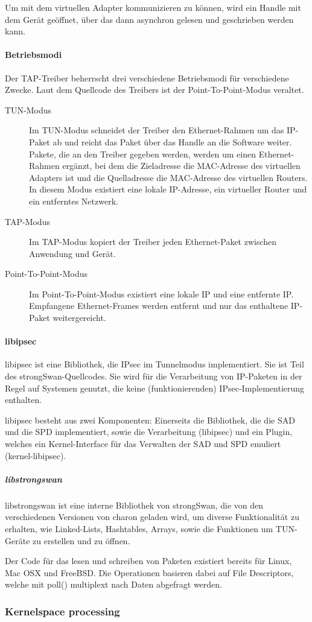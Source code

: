 Um mit dem virtuellen Adapter kommunizieren zu können, wird ein Handle mit dem Gerät
geöffnet, über das dann asynchron gelesen und geschrieben werden kann.

\paragraph{Betriebsmodi}
Der TAP-Treiber beherrscht drei verschiedene Betriebsmodi für verschiedene Zwecke.
Laut dem Quellcode des Treibers ist der Point-To-Point-Modus veraltet.
\begin{description}
\item [TUN-Modus] Im TUN-Modus schneidet der Treiber den Ethernet-Rahmen um das 
IP-Paket ab und reicht das Paket über das Handle an die Software weiter. 
Pakete, die an den Treiber gegeben werden, werden um einen Ethernet-Rahmen
ergänzt, bei dem die Zieladresse die MAC-Adresse des virtuellen Adapters ist 
und die Quelladresse die MAC-Adresse des virtuellen Routers.
In diesem Modus existiert eine lokale IP-Adresse, ein virtueller Router und 
ein entferntes Netzwerk.
\item [TAP-Modus] Im TAP-Modus kopiert der Treiber jeden Ethernet-Paket zwischen 
Anwendung und Gerät.
\item [Point-To-Point-Modus] Im Point-To-Point-Modus existiert eine lokale IP 
und eine entfernte IP. Empfangene Ethernet-Frames werden entfernt und nur
das enthaltene IP-Paket weitergereicht.
\end{description}

\paragraph{libipsec}
libipsec ist eine Bibliothek, die IPsec im Tunnelmodus implementiert.
Sie ist Teil des strongSwan-Quellcodes. Sie wird für die Verarbeitung von IP-Paketen
in der Regel auf Systemen genutzt, die keine (funktionierenden) IPsec-Implementierung
enthalten.

libipsec besteht aus zwei Komponenten: Einerseits die Bibliothek, die die SAD und die SPD
implementiert, sowie die Verarbeitung (libipsec) und ein Plugin, welches ein Kernel-Interface
für das Verwalten der \ac{SAD} und \ac{SPD} emuliert (kernel-libipsec).
\subparagraph{libstrongswan}
libstrongswan ist eine interne Bibliothek von strongSwan, die von den verschiedenen
Versionen von charon geladen wird, um diverse Funktionalität zu erhalten, wie
Linked-Lists, Hashtables, Arrays, sowie die Funktionen um TUN-Geräte zu erstellen und zu öffnen.

Der Code für das lesen und schreiben von Paketen existiert bereits für Linux, Mac OSX
und FreeBSD.
Die Operationen basieren dabei auf File Descriptors, welche mit poll() multiplext nach
Daten abgefragt werden.

\subsubsection{Kernelspace processing}

